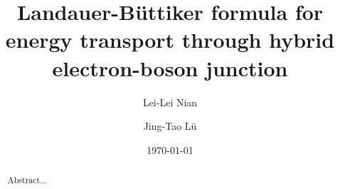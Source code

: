 \documentclass[aps
,floatfix,footinbib,
preprint
]{revtex4-1}
\begin{document}

\title{Landauer-B\"uttiker formula for energy transport through hybrid electron-boson junction}%

\author{Lei-Lei Nian}

\author{Jing-Tao L\"{u}}


\date{\today}%
\begin{abstract}
Abstract...
\end{abstract}


\maketitle

\end{document}
